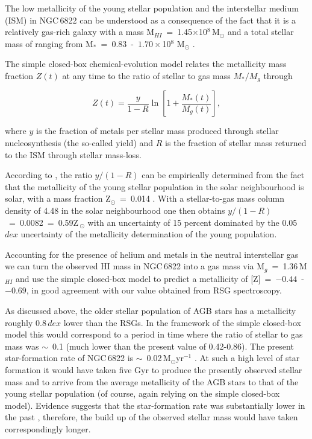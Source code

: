 The low metallicity of the young stellar population and the interstellar medium (ISM) in NGC\,6822 can be understood as a consequence of the fact that it is a relatively gas-rich galaxy with a mass
M$_{HI}$~=~1.45$\times$10$^{8}$\,M$_{\odot}$
\citep{2004AJ....128...16K} and a total stellar mass of ranging from
M$_{*}$~=~$0.83$~-~$1.70\times$10$^{8}$ M$_{\odot}$
\citep{2008MNRAS.390.1453W,2013ApJ...779..102K,2014ApJ...789..147W}.

The simple closed-box chemical-evolution model relates the metallicity mass fraction $Z(t)$ at any time to the ratio of stellar to gas mass $M_{*}/M_{g}$ through

\begin{equation}\label{closed-box}
Z(t) = \frac{y}{1-R} \ln \left[ 1 + \frac{M_{*}(t)}{M_{g}(t)}  \right],
\end{equation}

\noindent where $y$ is the fraction of metals per stellar mass produced through stellar nucleosynthesis
(the so-called yield) and $R$ is the fraction of stellar mass returned to the ISM through stellar mass-loss.

According to
\citet{2015MNRAS.450..342K}, the ratio $y/(1-R)$ can be empirically determined from the fact that the metallicity of the young stellar population in the solar neighbourhood is solar, with a mass fraction Z$_{\odot}$~=~0.014
\citep{2012A&A...539A.143N}.
With a stellar-to-gas mass column density of 4.48 in the solar neighbourhood
\citep{2003ApJ...587..278W,2013ApJ...779..115B}
one then obtains $y/(1-R)$~=~0.0082~=~0.59Z\,$_{\odot}$ with an uncertainty of 15 percent dominated by the 0.05\,$dex$ uncertainty of the metallicity determination of the young population.

Accounting for the presence of helium and metals in the neutral interstellar gas we can turn the observed HI mass in NGC\,6822 into a gas mass via
M$_{g}$~=~1.36\,M$_{HI}$ and use the simple closed-box model to predict a metallicity of
[Z]~=~$-0.44$~-~$-0.69$,
in good agreement with our value obtained from RSG spectroscopy.

As discussed above, the older stellar population of AGB stars has a metallicity roughly 0.8\,$dex$ lower than the RSGs.
In the framework of the simple closed-box model this would correspond to a period in time where the ratio of stellar to gas mass was $\sim$~0.1
(much lower than the present value of 0.42-0.86).
The present star-formation rate of NGC\,6822 is $\sim$~0.02\,M$_{\odot}$yr$^{-1}$
\citep{2010A&A...512A..68G,2011ApJ...730...88E}.
At such a high level of star formation it would have taken five Gyr to produce the presently observed stellar mass and to arrive from the average metallicity of the AGB stars to that of the young stellar population
(of course, again relying on the simple closed-box model).
Evidence suggests that the star-formation rate was substantially lower in the past
\citep{2011ApJ...730...88E,2014ApJ...789..147W},
therefore, the build up of the observed stellar mass would have taken correspondingly longer.


